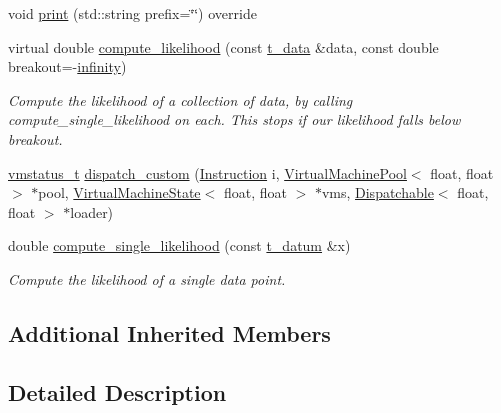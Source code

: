 \begin{DoxyCompactItemize}
void \hyperlink{class_my_hypothesis_a91fd22a2724e04c0e7c67ea4282beac4}{print} (std\+::string prefix=\char`\"{}\char`\"{}) override
\item 
virtual double \hyperlink{class_my_hypothesis_a85348639689176eaf456aaadd63cef2f}{compute\+\_\+likelihood} (const \hyperlink{class_bayesable_a70a593a67c7d43239ecc06bb4fd06a6b}{t\+\_\+data} \&data, const double breakout=-\/\hyperlink{_numerics_8h_a1bb1e42ae1b40cad6e99da0aab8a5576}{infinity})
\begin{DoxyCompactList}\small\item\em Compute the likelihood of a collection of data, by calling compute\+\_\+single\+\_\+likelihood on each. This stops if our likelihood falls below breakout. \end{DoxyCompactList}\item 
\hyperlink{_instruction_8h_a6202215407ab29590bb936ca2996cf64}{vmstatus\+\_\+t} \hyperlink{class_my_hypothesis_a3de47a545e8824bb8c63181965c62a01}{dispatch\+\_\+custom} (\hyperlink{class_instruction}{Instruction} i, \hyperlink{class_virtual_machine_pool}{Virtual\+Machine\+Pool}$<$ float, float $>$ $\ast$pool, \hyperlink{class_virtual_machine_state}{Virtual\+Machine\+State}$<$ float, float $>$ $\ast$vms, \hyperlink{class_dispatchable}{Dispatchable}$<$ float, float $>$ $\ast$loader)
\item 
double \hyperlink{class_my_hypothesis_a5e6bd5e0ebcb987aa4f0adf4295dba11}{compute\+\_\+single\+\_\+likelihood} (const \hyperlink{class_bayesable_a7c93a2eeab708378eb321745908718d4}{t\+\_\+datum} \&x)
\begin{DoxyCompactList}\small\item\em Compute the likelihood of a single data point. \end{DoxyCompactList}\end{DoxyCompactItemize}
\subsection*{Additional Inherited Members}


\subsection{Detailed Description}

